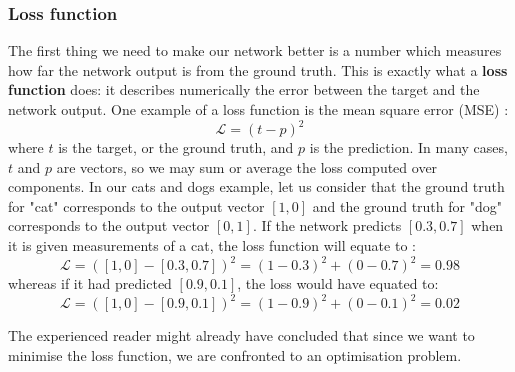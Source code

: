 \subsubsection{Loss function}
The first thing we need to make our network better is a number which measures
how far the network output is from the ground truth.
This is exactly what a \textbf{loss function}  does: 
it describes numerically the error between the target and the network output.
One example of a loss function is the mean square error (MSE) :
$$ \mathcal{L} = (t-p)^2$$
where $t$ is the target, or the ground truth, and $p$ is the prediction. In
many cases, $t$ and $p$ are vectors, so we may sum or average the loss computed
over components.
In our cats and dogs example, let us consider that the ground truth for
"cat" corresponds to the output vector $[1, 0]$ and the ground truth for "dog"
corresponds to the output vector $[0, 1]$. If the network predicts $[0.3, 0.7]$
when it is given measurements of a cat, the loss function will equate to :
$$ \mathcal{L} = ([1, 0]-[0.3, 0.7])^2 = (1-0.3)^2 + (0-0.7)^2 = 0.98$$
whereas if it had predicted $[0.9, 0.1]$, the loss would have equated to:
$$ \mathcal{L} = ([1, 0]-[0.9, 0.1])^2 = (1-0.9)^2 + (0-0.1)^2 = 0.02$$

The experienced reader might already have concluded that since we want to
minimise the loss function, we are confronted to an optimisation problem.

